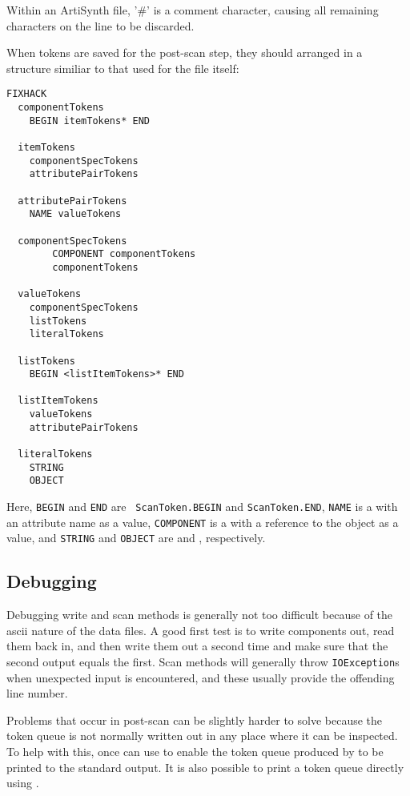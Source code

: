 \documentclass{article}
\begin{document}
Within an ArtiSynth file, '\#' is a comment character, causing all
remaining characters on the line to be discarded.

When tokens are saved for the post-scan step, they 
should arranged in a structure similiar to that used
for the file itself:
\begin{lstlisting}FIXHACK
  componentTokens
	BEGIN itemTokens* END

  itemTokens
	componentSpecTokens
	attributePairTokens

  attributePairTokens
	NAME valueTokens

  componentSpecTokens
        COMPONENT componentTokens
        componentTokens

  valueTokens
	componentSpecTokens
	listTokens
	literalTokens

  listTokens
	BEGIN <listItemTokens>* END

  listItemTokens
	valueTokens
	attributePairTokens

  literalTokens
	STRING
	OBJECT
\end{lstlisting}
Here, {\tt BEGIN} and {\tt END} are {\tt
ScanToken.BEGIN} and {\tt ScanToken.END}, {\tt NAME} is a
 with an attribute name as
a value, {\tt COMPONENT} is a
 with a reference to the
object as a value, and {\tt STRING} and {\tt OBJECT} are
 and
, respectively.

\subsection{Debugging}

Debugging write and scan methods is generally not too difficult
because of the ascii nature of the data files. A good first test is to
write components out, read them back in, and then write them out a
second time and make sure that the second output equals the
first. Scan methods will generally throw {\tt IOException}s when
unexpected input is encountered, and these usually provide the
offending line number. 

Problems that occur in post-scan can be slightly harder to solve
because the token queue is not normally written out in any place where it can
be inspected. To help with this, once can use
to enable the token queue produced by
 to be
printed to the standard output. It is also possible to print a token
queue directly using 
.
\end{document}
